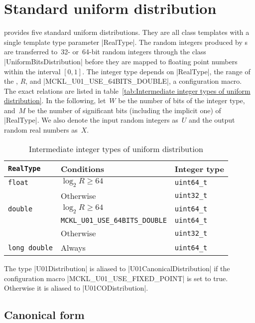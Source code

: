 \section{Standard uniform distribution}
\label{sec:Standard uniform distribution}

\mckl provides five standard uniform distributions. They are all class
templates with a single template type parameter |RealType|. The random integers
produced by \rng{}s are transferred to~32- or~64-bit random integers through
the class |UniformBitsDistribution| before they are mapped to floating point
numbers within the interval $[0, 1]$. The integer type depends on |RealType|,
the range of the \rng{}, $R$, and |MCKL_U01_USE_64BITS_DOUBLE|, a configuration
macro. The exact relations are listed in table~\ref{tab:Intermediate integer
types of uniform distribution}. In the following, let~$W$ be the number of bits
of the integer type, and~$M$ be the number of significant bits (including the
implicit one) of |RealType|. We also denote the input random integers as~$U$
and the output random real numbers as~$X$.

\begin{table}
  \begin{tabularx}{\textwidth}{LlL}
    \toprule
    \texttt{RealType} & Conditions & Integer type \\
    \midrule
    \texttt{float}  & $\log_2 R \ge 64$ & \texttt{uint64\_t} \\
                    & Otherwise         & \texttt{uint32\_t} \\
    \texttt{double} & $\log_2 R \ge 64$ & \texttt{uint64\_t} \\
    & \texttt{MCKL\_U01\_USE\_64BITS\_DOUBLE} & \texttt{uint64\_t} \\
    & Otherwise & \texttt{uint32\_t} \\
    \texttt{long double} & Always & \texttt{uint64\_t} \\
    \bottomrule
  \end{tabularx}
  \caption{Intermediate integer types of uniform distribution}
  \label{tab:Intermediate integer types of uniform distribution}
\end{table}

The type |U01Distribution| is aliased to |U01CanonicalDistribution| if the
configuration macro |MCKL_U01_USE_FIXED_POINT| is set to true. Otherwise it is
aliased to |U01CODistribution|.

\subsection{Canonical form}
\label{sub:Canonical form}

